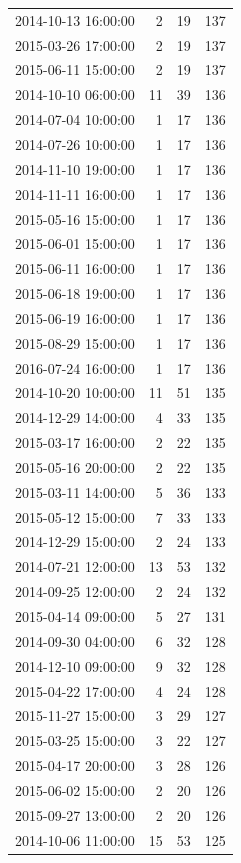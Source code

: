 \begin{tabular}{lrrr}
2014-10-13 16:00:00 & 2 & 19 & 137 \\
2015-03-26 17:00:00 & 2 & 19 & 137 \\
2015-06-11 15:00:00 & 2 & 19 & 137 \\
2014-10-10 06:00:00 & 11 & 39 & 136 \\
2014-07-04 10:00:00 & 1 & 17 & 136 \\
2014-07-26 10:00:00 & 1 & 17 & 136 \\
2014-11-10 19:00:00 & 1 & 17 & 136 \\
2014-11-11 16:00:00 & 1 & 17 & 136 \\
2015-05-16 15:00:00 & 1 & 17 & 136 \\
2015-06-01 15:00:00 & 1 & 17 & 136 \\
2015-06-11 16:00:00 & 1 & 17 & 136 \\
2015-06-18 19:00:00 & 1 & 17 & 136 \\
2015-06-19 16:00:00 & 1 & 17 & 136 \\
2015-08-29 15:00:00 & 1 & 17 & 136 \\
2016-07-24 16:00:00 & 1 & 17 & 136 \\
2014-10-20 10:00:00 & 11 & 51 & 135 \\
2014-12-29 14:00:00 & 4 & 33 & 135 \\
2015-03-17 16:00:00 & 2 & 22 & 135 \\
2015-05-16 20:00:00 & 2 & 22 & 135 \\
2015-03-11 14:00:00 & 5 & 36 & 133 \\
2015-05-12 15:00:00 & 7 & 33 & 133 \\
2014-12-29 15:00:00 & 2 & 24 & 133 \\
2014-07-21 12:00:00 & 13 & 53 & 132 \\
2014-09-25 12:00:00 & 2 & 24 & 132 \\
2015-04-14 09:00:00 & 5 & 27 & 131 \\
2014-09-30 04:00:00 & 6 & 32 & 128 \\
2014-12-10 09:00:00 & 9 & 32 & 128 \\
2015-04-22 17:00:00 & 4 & 24 & 128 \\
2015-11-27 15:00:00 & 3 & 29 & 127 \\
2015-03-25 15:00:00 & 3 & 22 & 127 \\
2015-04-17 20:00:00 & 3 & 28 & 126 \\
2015-06-02 15:00:00 & 2 & 20 & 126 \\
2015-09-27 13:00:00 & 2 & 20 & 126 \\
2014-10-06 11:00:00 & 15 & 53 & 125 \\

\end{tabular}
